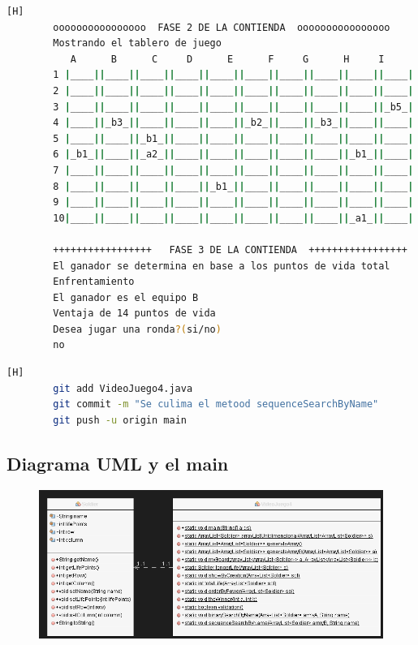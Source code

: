 \documentclass{article}
\begin{document}
\begin{lstlisting}[language=bash,caption={Compilando y probando el código terminado  }][H]
		oooooooooooooooo  FASE 2 DE LA CONTIENDA  oooooooooooooooo
		Mostrando el tablero de juego
	       A      B      C     D      E      F     G      H     I      J
		1 |____||____||____||____||____||____||____||____||____||____|
		2 |____||____||____||____||____||____||____||____||____||____|
		3 |____||____||____||____||____||____||____||____||____||_b5_|
		4 |____||_b3_||____||____||____||_b2_||____||_b3_||____||____|
		5 |____||____||_b1_||____||____||____||____||____||____||____|
		6 |_b1_||____||_a2_||____||____||____||____||____||_b1_||____|
		7 |____||____||____||____||____||____||____||____||____||____|
		8 |____||____||____||____||_b1_||____||____||____||____||____|
		9 |____||____||____||____||____||____||____||____||____||____|
		10|____||____||____||____||____||____||____||____||_a1_||____|
		
		+++++++++++++++++   FASE 3 DE LA CONTIENDA  +++++++++++++++++
		El ganador se determina en base a los puntos de vida total
		Enfrentamiento
		El ganador es el equipo B
		Ventaja de 14 puntos de vida
		Desea jugar una ronda?(si/no)
		no
	\end{lstlisting}
	
	\begin{lstlisting}[language=bash,caption={Commit: 5575a0d5eead5b5dd4dca7425a5b9f37229e25fa}][H]
		git add VideoJuego4.java
		git commit -m "Se culima el metood sequenceSearchByName"			
		git push -u origin main
	\end{lstlisting}
	
	
	\subsection{Diagrama UML y el main}
	
	\begin{figure}[H]
		\centering
		\includegraphics[width=1\textwidth,keepaspectratio]{img/uml.png}
	\end{figure}
	
\end{document}
